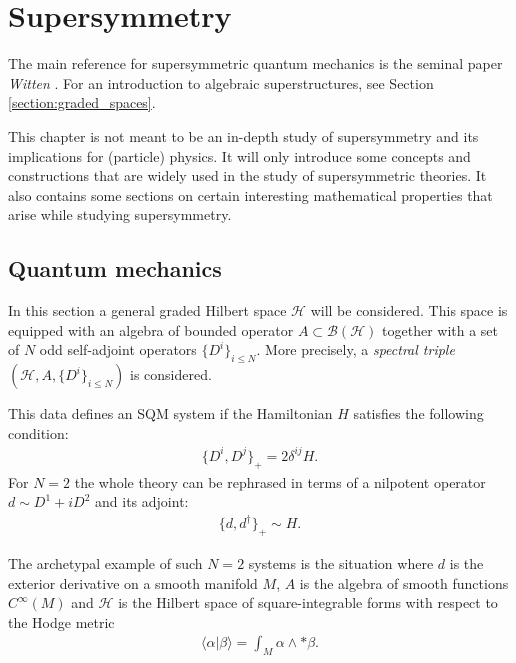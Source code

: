 \chapter{Supersymmetry}

    The main reference for supersymmetric quantum mechanics is the seminal paper \textit{Witten} \cite{witten_morse}. For an introduction to algebraic superstructures, see Section \ref{section:graded_spaces}.

    This chapter is not meant to be an in-depth study of supersymmetry and its implications for (particle) physics. It will only introduce some concepts and constructions that are widely used in the study of supersymmetric theories. It also contains some sections on certain interesting mathematical properties that arise while studying supersymmetry.

\section{Quantum mechanics}

    In this section a general graded Hilbert space $\mathcal{H}$ will be considered. This space is equipped with an algebra of bounded operator $A\subset\mathcal{B}(\mathcal{H})$ together with a set of $N$ odd self-adjoint operators $\{D^i\}_{i\leq N}$. More precisely, a \textit{spectral triple} $(\mathcal{H},A,\{D^i\}_{i\leq N})$ is considered.

    This data defines an SQM system if the Hamiltonian $H$ satisfies the following condition:
    \begin{gather}
        \{D^i,D^j\}_+ = 2\delta^{ij}H.
    \end{gather}
    For $N=2$ the whole theory can be rephrased in terms of a nilpotent operator $d\sim D^1+iD^2$ and its adjoint:
    \begin{gather}
        \{d,d^\dagger\}_+\sim H.
    \end{gather}

    \begin{example}
        The archetypal example of such $N=2$ systems is the situation where $d$ is the exterior derivative on a smooth manifold $M$, $A$ is the algebra of smooth functions $C^\infty(M)$ and $\mathcal{H}$ is the Hilbert space of square-integrable forms with respect to the Hodge metric
        \begin{gather}
            \langle\alpha|\beta\rangle = \int_M\alpha\wedge\ast\beta.
        \end{gather}
    \end{example}

